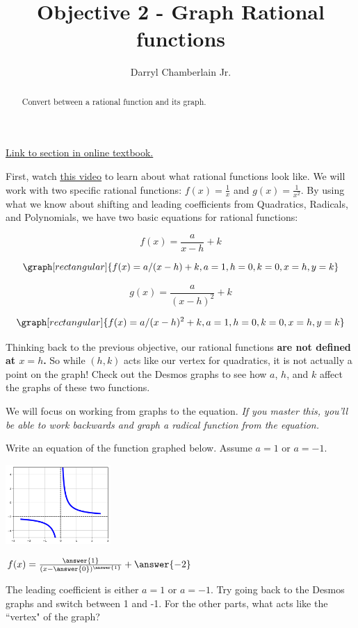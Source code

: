 \documentclass{ximera}
\author{Darryl Chamberlain Jr.}
\title{Objective 2 - Graph Rational functions}
\begin{document}
\begin{abstract}
Convert between a rational function and its graph.
\end{abstract}
\maketitle

\href{https://cnx.org/contents/mwjClAV_@8.1:KNTP2r7D@13/Rational-Functions}{Link to section in online textbook.}


First, watch 
\underline{\href{https://www.youtube.com/watch?v=mrZPVpbn4lA}{this video}} 
to learn about what rational functions look like. We will work with two specific rational functions: $f(x) = \frac{1}{x}$ and $g(x)=\frac{1}{x^2}$. By using what we know about shifting and leading coefficients from Quadratics, Radicals, and Polynomials, we have two basic equations for rational functions: 

$$ f(x) = \frac{a}{x-h} + k $$

\[
\graph[rectangular]{f(x) = a/(x-h) + k, a=1, h=0, k=0, x=h, y=k}
\]

$$ g(x) = \frac{a}{(x-h)^2} + k $$

\[
\graph[rectangular]{f(x) = a/(x-h)^2 + k, a=1, h=0, k=0, x=h, y=k}
\]

Thinking back to the previous objective, our rational functions \textbf{are not defined at $x=h$.} So while $(h, k)$ acts like our vertex for quadratics, it is not actually a point on the graph! Check out the Desmos graphs to see how $a$, $h$, and $k$ affect the graphs of these two functions. 

We will focus on working from graphs to the equation. \textit{If you master this, you'll be able to work backwards and graph a radical function from the equation.} 

\begin{question}
Write an equation of the function graphed below. Assume $a = 1$ or $a=-1$.

	\begin{center}
	    \includegraphics[width = 0.3\textwidth]{graphRationalQ1.png}
	\end{center}

$f(x) = \frac{\answer{1}}{(x - \answer{0})^{\answer{1}}} + \answer{-2}$

\begin{hint}
The leading coefficient is either $a=1$ or $a=-1$. Try going back to the Desmos graphs and switch between 1 and -1. For the other parts, what acts like the ``vertex" of the graph?
\end{hint}
\end{question}
\end{document}
